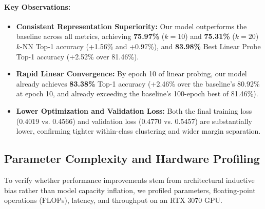 \documentclass[11pt,a4paper]{article}
\begin{document}
\paragraph{Key Observations:}
\begin{itemize}[leftmargin=*]
    \item \textbf{Consistent Representation Superiority:} Our model outperforms the baseline across all metrics, achieving \textbf{75.97\%} ($k=10$) and \textbf{75.31\%} ($k=20$) $k$-NN Top-1 accuracy (+1.56\% and +0.97\%), and \textbf{83.98\%} Best Linear Probe Top-1 accuracy (+2.52\% over 81.46\%).
    \item \textbf{Rapid Linear Convergence:} By epoch 10 of linear probing, our model already achieves \textbf{83.38\%} Top-1 accuracy (+2.46\% over the baseline's 80.92\% at epoch 10, and already exceeding the baseline's 100-epoch best of 81.46\%).
    \item \textbf{Lower Optimization and Validation Loss:} Both the final training loss (0.4019 vs. 0.4566) and validation loss (0.4770 vs. 0.5457) are substantially lower, confirming tighter within-class clustering and wider margin separation.
\end{itemize}

\subsection{Parameter Complexity and Hardware Profiling}

To verify whether performance improvements stem from architectural inductive bias rather than model capacity inflation, we profiled parameters, floating-point operations (FLOPs), latency, and throughput on an RTX 3070 GPU.
\end{document}
